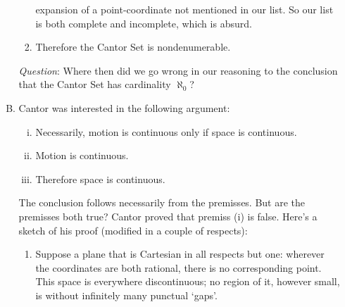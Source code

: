 \documentclass[polutonikogreek,english,twoside,openright]{article}
\begin{document}
\begin{enumerate}
\begin{enumerate}[A.]
\begin{enumerate}[(1)]
        expansion of a point-coordinate not mentioned in our list. So
        our list is both complete and incomplete, which is absurd.
      \item Therefore the Cantor Set is nondenumerable.
      \end{enumerate}
      \emph{Question}: Where then did we go wrong in our reasoning to
      the conclusion that the Cantor Set has cardinality $\aleph_0$?
    \item Cantor was interested in the following argument:
      \begin{enumerate}[(i)]
      \item Necessarily, motion is continuous only if space is
        continuous.
      \item Motion is continuous.
      \item Therefore space is continuous.
      \end{enumerate}
      The conclusion follows necessarily from the premisses. But are
      the premisses both true? Cantor proved that premiss (i) is
      false. Here's a sketch of his proof (modified in a couple of
      respects):
      \begin{enumerate}[(1)]
      \item Suppose a plane that is Cartesian in all respects but one:
        wherever the coordinates are both rational, there is no
        corresponding point. This space is everywhere discontinuous;
        no region of it, however small, is without infinitely many
        punctual `gaps'.


\end{enumerate}
\end{enumerate}
\end{enumerate}
\end{document}
